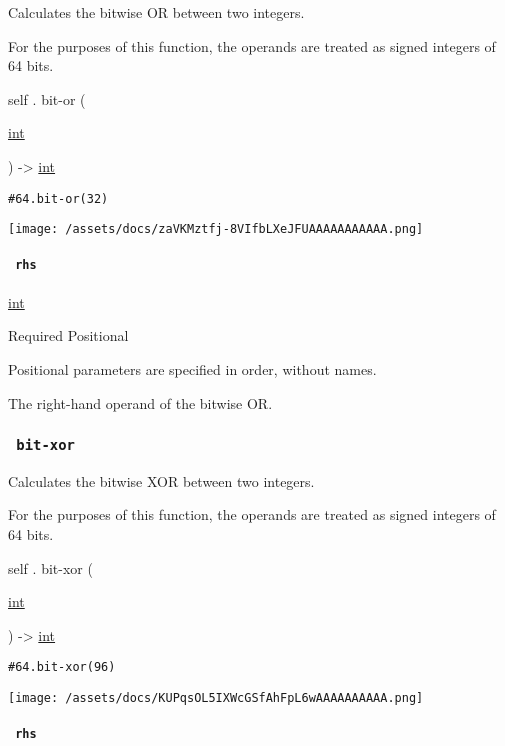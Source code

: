 Calculates the bitwise OR between two integers.

For the purposes of this function, the operands are treated as signed
integers of 64 bits.

self { . } { bit-or } (

{ \href{/docs/reference/foundations/int/}{int} }

) -\textgreater{} \href{/docs/reference/foundations/int/}{int}

\begin{verbatim}
#64.bit-or(32)
\end{verbatim}

\texttt{[image: /assets/docs/zaVKMztfj-8VIfbLXeJFUAAAAAAAAAAA.png]}

\paragraph{\texorpdfstring{\texttt{\ rhs\ }}{ rhs }}\label{definitions-bit-or-rhs}

\href{/docs/reference/foundations/int/}{int}

{Required} {{ Positional }}

\label{definitions-bit-or-rhs-positional-tooltip}
Positional parameters are specified in order, without names.

The right-hand operand of the bitwise OR.

\subsubsection{\texorpdfstring{\texttt{\ bit-xor\ }}{ bit-xor }}\label{definitions-bit-xor}

Calculates the bitwise XOR between two integers.

For the purposes of this function, the operands are treated as signed
integers of 64 bits.

self { . } { bit-xor } (

{ \href{/docs/reference/foundations/int/}{int} }

) -\textgreater{} \href{/docs/reference/foundations/int/}{int}

\begin{verbatim}
#64.bit-xor(96)
\end{verbatim}

\texttt{[image: /assets/docs/KUPqsOL5IXWcGSfAhFpL6wAAAAAAAAAA.png]}

\paragraph{\texorpdfstring{\texttt{\ rhs\ }}{ rhs }}\label{definitions-bit-xor-rhs}


